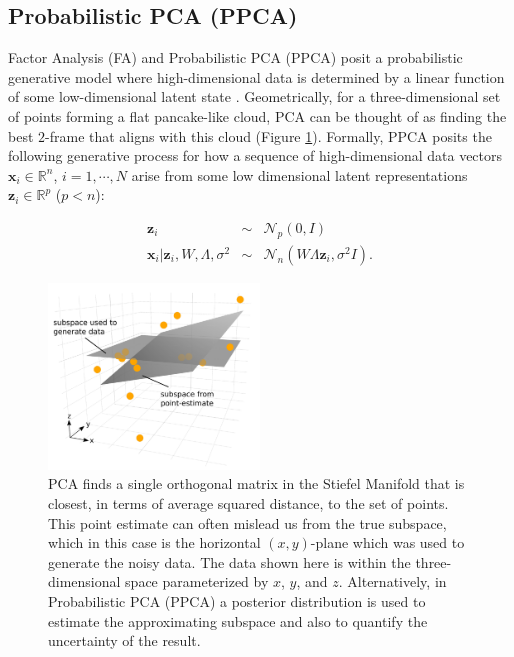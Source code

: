 \documentclass[ba]{imsart}
\newcommand{\mb}[1]{\mathbf{#1}}
\numberwithin{equation}{section}
\theoremstyle{plain}
\begin{document}
\subsection{Probabilistic PCA (PPCA)}
Factor Analysis (FA) and Probabilistic PCA (PPCA) \citep{tipping1999probabilistic} posit a probabilistic generative model where high-dimensional data is determined by a linear function of some low-dimensional latent state \cite[Chapt.~12]{murphy2012machine}. Geometrically, for a three-dimensional set of points forming a flat pancake-like cloud, PCA can be thought of as finding the best $2$-frame that aligns with this cloud (Figure \ref{fig:MleSubspaceEstimate}). Formally, PPCA posits the following generative process for how a sequence of high-dimensional data vectors $\mathbf{x}_i \in \mathbb{R}^n$, $i = 1, \cdots, N$ arise from some low dimensional latent representations $\mathbf{z}_i \in \mathbb{R}^p$ ($p < n$):

\begin{eqnarray}
\label{eq:PpcaGenerativeProcess}
\mb{z}_i &\sim& \mathcal{N}_p(0, I) \nonumber\\
\mb{x}_i | \mb{z}_i, W, \Lambda, \sigma^2 &\sim& \mathcal{N}_n(W \Lambda \mb{z}_i, \sigma^2 I).
\end{eqnarray}

\begin{figure}[h]
\centering
\vspace{.1in}
\includegraphics[width=0.5\textwidth]{figures/uncertainty_atz.pdf}
\vspace{.05in}
\caption{PCA finds a single orthogonal matrix in the Stiefel Manifold that is closest, in terms of average squared distance, to the set of points.  This point estimate can often mislead us from the true subspace, which in this case is the horizontal $(x,y)$-plane which was used to generate the noisy data. The data shown here is within the three-dimensional space parameterized by $x$, $y$, and $z$.  Alternatively, in Probabilistic PCA (PPCA) a posterior distribution is used to estimate the approximating subspace and also to quantify the uncertainty of the result.}
\label{fig:MleSubspaceEstimate}
\end{figure}
\end{document}
